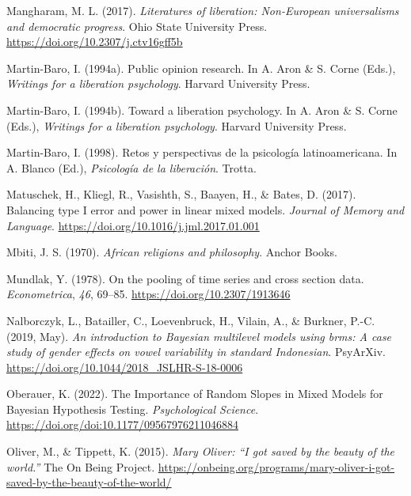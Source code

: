 \documentclass[
  letterpaper,
  DIV=11,
  numbers=noendperiod]{scrreprt}
\newlength{\cslhangindent}
\newenvironment{CSLReferences}[2] %
 {\begin{list}{}{%
  \setlength{\itemindent}{0pt}
  \setlength{\leftmargin}{0pt}
  \setlength{\parsep}{0pt}
  \ifodd #1
   \setlength{\leftmargin}{\cslhangindent}
   \setlength{\itemindent}{-1\cslhangindent}
  \fi
  \setlength{\itemsep}{#2\baselineskip}}}
 {\end{list}}
\begin{document}
\begin{CSLReferences}{1}{0}
Mangharam, M. L. (2017). \emph{Literatures of liberation: Non-{E}uropean
universalisms and democratic progress}. Ohio State University Press.
\url{https://doi.org/10.2307/j.ctv16gff5b}

Martin-Baro, I. (1994a). Public opinion research. In A. Aron \& S. Corne
(Eds.), \emph{Writings for a liberation psychology}. Harvard University
Press.

Martin-Baro, I. (1994b). Toward a liberation psychology. In A. Aron \&
S. Corne (Eds.), \emph{Writings for a liberation psychology}. Harvard
University Press.

Martin-Baro, I. (1998). {Retos y perspectivas de la psicología
latinoamericana}. In A. Blanco (Ed.), \emph{Psicología de la
liberación}. Trotta.

Matuschek, H., Kliegl, R., Vasishth, S., Baayen, H., \& Bates, D.
(2017). Balancing type {I} error and power in linear mixed models.
\emph{Journal of Memory and Language}.
\url{https://doi.org/10.1016/j.jml.2017.01.001}

Mbiti, J. S. (1970). \emph{African religions and philosophy}. Anchor
Books.

Mundlak, Y. (1978). On the pooling of time series and cross section
data. \emph{Econometrica}, \emph{46}, 69--85.
\url{https://doi.org/10.2307/1913646}

Nalborczyk, L., Batailler, C., Loevenbruck, H., Vilain, A., \& Burkner,
P.-C. (2019, May). \emph{An introduction to {B}ayesian multilevel models
using brms: A case study of gender effects on vowel variability in
standard {I}ndonesian}. PsyArXiv.
\url{https://doi.org/10.1044/2018_JSLHR-S-18-0006}

Oberauer, K. (2022). {The Importance of Random Slopes in Mixed Models
for Bayesian Hypothesis Testing}. \emph{Psychological Science}.
\url{https://doi.org/doi:10.1177/09567976211046884}

Oliver, M., \& Tippett, K. (2015). \emph{{M}ary {O}liver: {``{I} got
saved by the beauty of the world.''}} The On Being Project.
\url{https://onbeing.org/programs/mary-oliver-i-got-saved-by-the-beauty-of-the-world/}


\end{CSLReferences}
\end{document}

